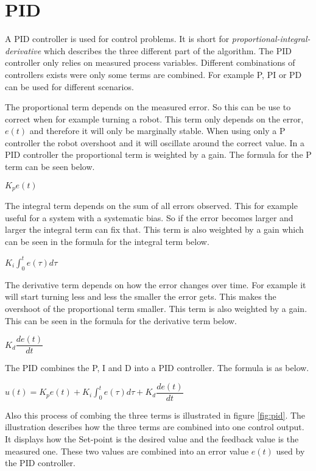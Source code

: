 \chapter{PID}
\label{chp:pid}
A PID controller is used for control problems. It is short for \emph{proportional-integral-derivative} which describes the three different part of the algorithm. The PID controller only relies on measured process variables. Different combinations of controllers exists were only some terms are combined. For example P, PI or PD can be used for different scenarios. 

The proportional term depends on the measured error. So this can be use to correct when for example turning a robot. This term only depends on the error, $e(t)$ and therefore it will only be marginally stable. When using only a P controller the robot overshoot and it will oscillate around the correct value. In a PID controller the proportional term is weighted by a gain. The formula for the P term can be seen below.
\begin{center}
	$K_p e(t)$
\end{center}

The integral term depends on the sum of all errors observed. This for example useful for a system with a systematic bias. So if the error becomes larger and larger the integral term can fix that. This term is also weighted by a gain which can be seen in the formula for the integral term below.

\begin{center}
	$K_i \int_{0}^{t} e(\tau) d\tau$
\end{center}

The derivative term depends on how the error changes over time. For example it will start turning less and less the smaller the error gets. This makes the overshoot of the proportional term smaller. This term is also weighted by a gain. This can be seen in the formula for the derivative term below.

\begin{center}
	$K_d \dfrac{de(t)}{dt}$
\end{center}

The PID combines the P, I and D into a PID controller. The formula is as below.

\begin{center}
	$u(t) =  K_p e(t) + K_i \int_{0}^{t} e(\tau) d\tau + K_d \dfrac{de(t)}{dt}$
\end{center}

Also this process of combing the three terms is illustrated in figure \ref{fig:pid}. The illustration describes how the three terms are combined into one control output. It displays how the Set-point is the desired value and the feedback value is the measured one. These two values are combined into an error value $e(t)$ used by the PID controller.

